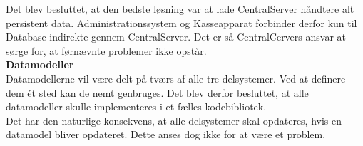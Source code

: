 Det blev besluttet, at den bedste løsning var at lade CentralServer håndtere alt persistent data. Administrationssystem og Kasseapparat forbinder derfor kun til Database indirekte gennem CentralServer. Det er så CentralCervers ansvar at sørge for, at førnævnte problemer ikke opstår.\\

\textbf{Datamodeller}\\
Datamodellerne vil være delt på tværs af alle tre delsystemer. Ved at definere dem ét sted kan de nemt genbruges. Det blev derfor besluttet, at alle datamodeller skulle implementeres i et fælles kodebibliotek.\\

Det har den naturlige konsekvens, at alle delsystemer skal opdateres, hvis en datamodel bliver opdateret. Dette anses dog ikke for at være et problem.\\